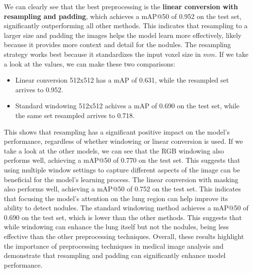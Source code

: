 We can clearly see that the best preprocessing is the \textbf{linear conversion with resampling and padding}, which achieves a mAP@50 of 0.952 on the test set, significantly outperforming all other methods. This indicates that resampling to a larger size and padding the images helps the model learn more effectively, likely because it provides more context and detail for the nodules. 
The resampling strategy works best because it standardizes the input voxel size in $mm$. If we take a look at the values, we can make these two comparisons: 
\begin{itemize}
    \item Linear conversion 512x512 has a mAP of 0.631, while the resampled set arrives to 0.952.
    \item Standard windowing 512x512 achives a mAP of 0.690 on the test set, while the same set resampled arrives to 0.718.
\end{itemize}
This shows that resampling has a significant positive impact on the model's performance, regardless of whether windowing or linear conversion is used.
If we take a look at the other models, we can see that the RGB windowing also performs well, achieving a mAP@50 of 0.770 on the test set. This suggests that using multiple window settings to capture different aspects of the image can be beneficial for the model's learning process. 
The linear conversion with masking also performs well, achieving a mAP@50 of 0.752 on the test set. This indicates that focusing the model's attention on the lung region can help improve its ability to detect nodules.
The standard windowing method achieves a mAP@50 of 0.690 on the test set, which is lower than the other methods. This suggests that while windowing can enhance the lung itself but not the nodules, being less effective than the other preprocessing techniques.
Overall, these results highlight the importance of preprocessing techniques in medical image analysis and demonstrate that resampling and padding can significantly enhance model performance.

\newpage

